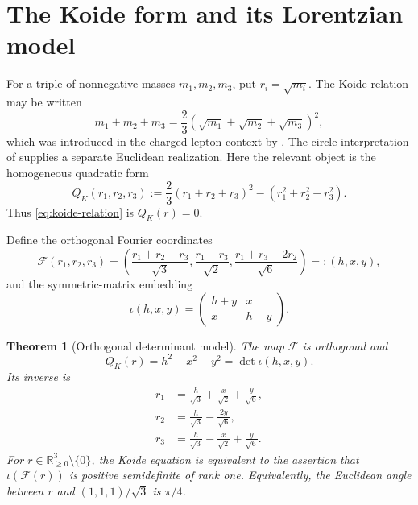\documentclass[11pt]{article}
\numberwithin{equation}{section}
\newtheorem{theorem}{Theorem}[section]
\theoremstyle{definition}
\theoremstyle{remark}
\newcommand{\R}{\mathbb R}
\begin{document}
\section{The Koide form and its Lorentzian model}

For a triple of nonnegative masses $m_1,m_2,m_3$, put $r_i=\sqrt{m_i}$.  The Koide relation may be written
\begin{equation}\label{eq:koide-relation}
 m_1+m_2+m_3=\frac23\left(\sqrt{m_1}+\sqrt{m_2}+\sqrt{m_3}\right)^2,
\end{equation}
which was introduced in the charged-lepton context by \citet{Koide_1983}.  The circle interpretation of \citet{Kocik_2012} supplies a separate Euclidean realization.  Here the relevant object is the homogeneous quadratic form
\begin{equation}\label{eq:QK}
 Q_K(r_1,r_2,r_3)
 :=\frac23(r_1+r_2+r_3)^2-(r_1^2+r_2^2+r_3^2).
\end{equation}
Thus \eqref{eq:koide-relation} is $Q_K(r)=0$.

Define the orthogonal Fourier coordinates
\begin{equation}\label{eq:Fourier}
 \mathcal F(r_1,r_2,r_3)
 =\left(
 \frac{r_1+r_2+r_3}{\sqrt3},
 \frac{r_1-r_3}{\sqrt2},
 \frac{r_1+r_3-2r_2}{\sqrt6}
 \right)=:(h,x,y),
\end{equation}
and the symmetric-matrix embedding
\begin{equation}\label{eq:iota}
 \iota(h,x,y)=
 \begin{pmatrix}h+y&x\\x&h-y\end{pmatrix}.
\end{equation}

\begin{theorem}[Orthogonal determinant model]\label{thm:orthogonal-model}
The map $\mathcal F$ is orthogonal and
\begin{equation}\label{eq:lorentz-identity}
 Q_K(r)=h^2-x^2-y^2=\det\iota(h,x,y).
\end{equation}
Its inverse is
\begin{align}
 r_1&=\frac h{\sqrt3}+\frac x{\sqrt2}+\frac y{\sqrt6},\label{eq:F-inv1}\\
 r_2&=\frac h{\sqrt3}-\frac{2y}{\sqrt6},\label{eq:F-inv2}\\
 r_3&=\frac h{\sqrt3}-\frac x{\sqrt2}+\frac y{\sqrt6}.\label{eq:F-inv3}
\end{align}
For $r\in\R_{\geq0}^3\setminus\{0\}$, the Koide equation is equivalent to the assertion that $\iota(\mathcal F(r))$ is positive semidefinite of rank one.  Equivalently, the Euclidean angle between $r$ and $(1,1,1)/\sqrt3$ is $\pi/4$.
\end{theorem}
\end{document}
